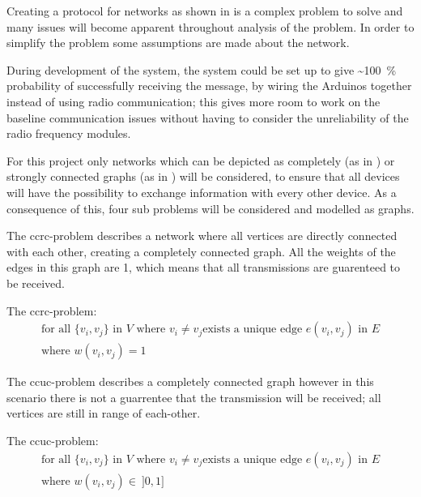 \noindent
Creating a protocol for networks as shown in  is a complex problem to solve and many issues will become apparent throughout analysis of the problem.
In order to simplify the problem some assumptions are made about the network.

During development of the system, the system could be set up to give \textasciitilde100~\% probability of successfully receiving the message, by wiring the Arduinos together instead of using radio communication; this gives more room to work on the baseline communication issues without having to consider the unreliability of the radio frequency modules.

For this project only networks which can be depicted as completely (as in ) or strongly connected graphs (as in ) will be considered, to ensure that all devices will have the possibility to exchange information with every other device.
As a consequence of this, four sub problems will be considered and modelled as graphs.

\bigskip

\noindent The \gls{ccrc}-problem describes a network where all vertices are directly connected with each other, creating a completely connected graph.
All the weights of the edges in this graph are 1, which means that all transmissions are guarenteed to be received. 	

\begin{definition}
	The \acrshort{ccrc}-problem:
	\begin{align*}
		\text{for all } \{v_i, v_j\} \text{ in } V \text{ where } v_i \neq v_j \text{exists a unique edge } e(v_i, v_j) \text{ in } E\\
		\text{where } w(v_i, v_j) = 1
	\end{align*}
\end{definition}

\noindent The \gls{ccuc}-problem describes a completely connected graph however in this scenario there is not a guarrentee that the transmission will be received; all vertices are still in range of each-other.

\begin{definition}
	The \acrshort{ccuc}-problem:
	\begin{align*}
		\text{for all } \{v_i, v_j\} \text{ in } V \text{ where } v_i \neq v_j \text{exists a unique edge } e(v_i, v_j) \text{ in } E\\
		\text{where } w(v_i, v_j) \in\ ]0, 1]
	\end{align*}
\end{definition} 


